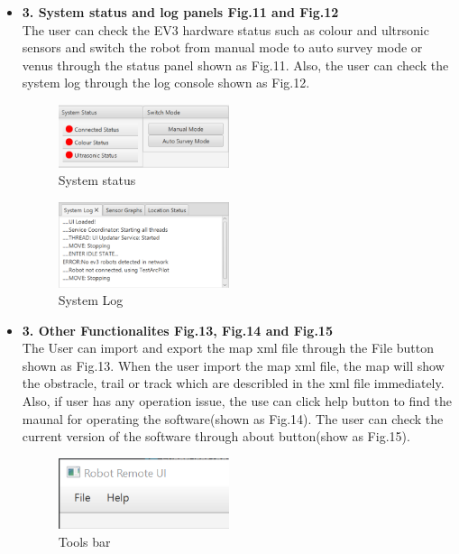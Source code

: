 \begin{itemize}
\item \textbf{3. System status and log panels Fig.11 and Fig.12}\\
The user can check the EV3 hardware status such as colour and ultrsonic sensors and switch the robot from manual mode to auto survey mode or venus through the status panel shown as Fig.11. Also, the user can check the system log through the log console shown as Fig.12.

\begin{figure}[H]
	\includegraphics[width=50mm]{Systemstatus.PNG}  
	\caption{System status}
	\label{fig:System Status}				
\end{figure}

\begin{figure}[H]
	\includegraphics[width=50mm]{SystemLog.PNG}  
	\caption{System Log}
	\label{fig:System Log}				
\end{figure}

\item \textbf{3. Other Functionalites Fig.13, Fig.14 and Fig.15}\\
The User can import and export the map xml file through the File button shown as Fig.13. When the user import the map xml file, the map will show the obstracle, trail or track which are describled in the xml file immediately. Also, if user has any operation issue, the use can click help button to find the maunal for operating the software(shown as Fig.14). The user can check the current version of the software through about button(show as Fig.15).

\begin{figure}[H]
	\includegraphics[width=50mm]{other.PNG}  
	\caption{Tools bar}
	\label{fig:Tools bar}				
\end{figure}


\end{itemize}
